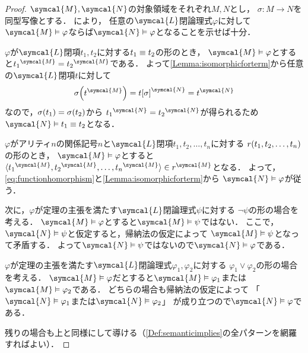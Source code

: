 \begin{proof}
	\(\symcal{M}, \symcal{N}\)の対象領域をそれぞれ\(M, N\)とし，
	\(\sigma \colon M \to N\)を同型写像とする．
	により，
	任意の\(\symcal{L}\)閉論理式\(\varphi\)に対して
	\(\symcal{M} \satisfy \varphi\)ならば\(\symcal{N} \satisfy \varphi\)となることを示せば十分．

	\(\varphi\)が\(\symcal{L}\)閉項\(t_1, t_2\)に対する\(t_1 \equiv t_2\)の形のとき，
	\(\symcal{M} \satisfy \varphi\)とすると\(\interpretation{\symcal{M}}{t_1} = \interpretation{\symcal{M}}{t_2}\)である．
	よって\cref{Lemma:isomorphicforterm}から任意の\(\symcal{L}\)閉項\(t\)に対して
	\[
		\apply{\sigma}{\interpretation{\symcal{M}}{t}}
		=
		\interpretation{\symcal{N}}{\subst{t}{\sigma}}
		=
		\interpretation{\symcal{N}}{t}
	\]
	なので，\(\apply{\sigma}{t_1} = \apply{\sigma}{t_2}\)から
	\(\interpretation{\symcal{N}}{t_1} = \interpretation{\symcal{N}}{t_2}\)が得られるため
	\(\symcal{N} \satisfy t_1 \objeq t_2\)となる．

	\(\varphi\)がアリティ\(n\)の関係記号\(n\)と\(\symcal{L}\)閉項\(t_1, t_2, \dots, t_n\)に対する
	\(\apply{r}{t_1, t_2, \dots, t_n}\)の形のとき，
	\(\symcal{M} \satisfy \varphi\)とすると
	\(\pair{
		\interpretation{\symcal{M}}{t_1},
		\interpretation{\symcal{M}}{t_2},
		\dots,
		\interpretation{\symcal{M}}{t_n}
	} \in \interpretation{\symcal{M}}{r}\)となる．
	よって，\cref{eq:functionhomorphism}と\cref{Lemma:isomorphicforterm}から
	\(\symcal{N} \satisfy \varphi\)が従う．

	次に，\(\varphi\)が定理の主張を満たす\(\symcal{L}\)閉論理式\(\psi\)に対する
	\(\lnot \psi\)の形の場合を考える．
	\(\symcal{M} \satisfy \varphi\)とすると\(\symcal{M} \satisfy \psi\)ではない．
	ここで，\(\symcal{N} \satisfy \psi\)と仮定すると，帰納法の仮定によって
	\(\symcal{M} \satisfy \psi\)となって矛盾する．
	よって\(\symcal{N} \satisfy \psi\)ではないので\(\symcal{N} \satisfy \varphi\)である．

	\(\varphi\)が定理の主張を満たす\(\symcal{L}\)閉論理式\(\varphi_1, \varphi_2\)に対する
	\(\varphi_1 \lor \varphi_2\)の形の場合を考える．
	\(\symcal{M} \satisfy \varphi\)だとすると\(\symcal{M} \satisfy \varphi_1\)または
	\(\symcal{M} \satisfy \varphi_2\)である．
	どちらの場合も帰納法の仮定によって
	「\(\symcal{N} \satisfy \varphi_1\)または\(\symcal{N} \satisfy \varphi_2\)」
	が成り立つので\(\symcal{N} \satisfy \varphi\)である．

	残りの場合も上と同様にして導ける（\cref{Def:semanticimplies}の全パターンを網羅すればよい）．
\end{proof}

